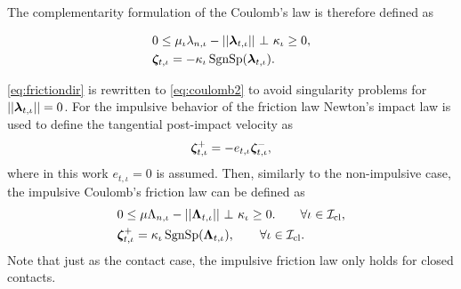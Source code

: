 \documentclass[../DC2017114Bouma.tex]{subfiles}
\begin{document}
The complementarity formulation of the Coulomb's law is therefore defined as

\begin{align}
&0\leq \mu_{\iota}\lambda_{n,\iota} - ||\lambdab_{t,\iota}||\ \bot\ \kappa_{\iota} \geq 0,\label{eq:coulomb1}\\
&\zetab_{t,\iota} = -\kappa_{\iota}\SgnSp(\lambdab_{t,\iota}).\label{eq:coulomb2}
\end{align}

\eqref{eq:frictiondir} is rewritten to \eqref{eq:coulomb2} to avoid singularity problems for $||\boldsymbol{\lambda}_{t,\iota}|| = 0$. For the impulsive behavior of the friction law Newton's impact law is used to define the tangential post-impact velocity as
\begin{align}
\boldsymbol{\zeta}^+_{t,\iota} = -e_{t,\iota}\boldsymbol{\zeta}^-_{t,\iota},
\end{align}
where in this work $e_{t,\iota}=0$ is assumed. Then, similarly to the non-impulsive case, the impulsive Coulomb's friction law can be defined as
\begin{align}
&0 \leq \mu\Lambda_{n,\iota} - ||\Lambdab_{t,\iota}||\ \bot\ \kappa_{\iota} \geq 0. \qquad \forall \iota\in\Ic_{\text{cl}},\label{eq:coulombimp1}\\
&\zetab_{t,\iota}^+ = \kappa_{\iota}\SgnSp(\Lambdab_{t,\iota}),\qquad \forall \iota\in\Ic_{\text{cl}}.\label{eq:coulombimp2}
\end{align}
Note that just as the contact case, the impulsive friction law only holds for closed contacts.
\end{document}
